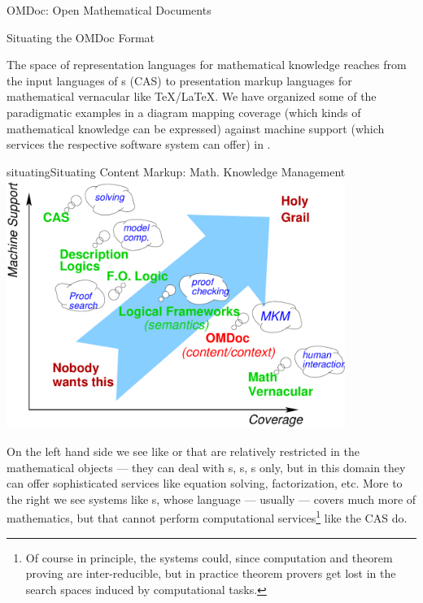 \begin{tchapter}[id=omdoc-markup,short=Open Mathematical Documents]{OMDoc: Open Mathematical Documents}
\begin{tsection}[id=situating]{Situating the OMDoc Format}

  The space of representation languages for mathematical knowledge reaches from the input
  languages of {s} (CAS) to
  presentation markup languages for mathematical vernacular like {\TeX/\LaTeX}. We have
  organized some of the paradigmatic examples in a diagram mapping coverage (which kinds
  of mathematical knowledge can be expressed) against machine support (which services the
  respective software system can offer) in {}.

\begin{myfig}{situating}{Situating Content Markup: Math. Knowledge Management}
  \includegraphics[width=11cm]{figures/support-coverage}
\end{myfig}

On the left hand side we see {} like {\mathematica}\cite{Wolfram.02} or
{\maple} {\cite{ChaGed:flatim92}} that are relatively restricted in the mathematical
objects --- they can deal with {s}, {s}, {s} only, but in this domain they
can offer sophisticated services like equation solving, factorization, etc.  More to the
right we see systems like {s},
whose language --- usually {} --- covers much more of
mathematics, but that cannot perform computational services\footnote{Of course in
  principle, the systems could, since computation and theorem proving are inter-reducible,
  but in practice theorem provers get lost in the search spaces induced by computational
  tasks.}  like the CAS do.


\end{tsection}
\end{tchapter}
